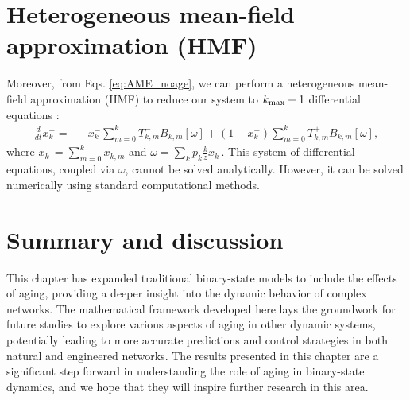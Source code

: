 

\section{\label{sec:Heterogeneous mean-field approximation}  Heterogeneous mean-field approximation (HMF)}

Moreover, from Eqs. \eqref{eq:AME_noage}, we can perform a heterogeneous mean-field approximation (HMF) to reduce our system to $k_{\rm max}+1$ differential equations \cite{gleeson-2013}:
\begin{eqnarray}
    \frac{d}{d t} x^{-}_{k}= &- x^{-}_{k} \sum_{m=0}^{k} T^{-}_{k, m} B_{k, m}[\omega] +\left(1-x^{-}_{k}\right) \sum_{m=0}^{k} T^{+}_{k, m} B_{k, m}[\omega],
    \label{eq:HMF}
\end{eqnarray}
where $x^{-}_{k} = \sum_{m=0}^{k} x^{-}_{k,m}$ and $\omega= \sum_k p_k \frac{k}{z} x^{-}_{k}$. This system of differential equations, coupled via $\omega$, cannot be solved analytically. However, it can be solved numerically using standard computational methods.


\section{\label{sec:Summary} Summary and discussion}

This chapter has expanded traditional binary-state models to include the effects of aging, providing a deeper insight into the dynamic behavior of complex networks. The mathematical framework developed here lays the groundwork for future studies to explore various aspects of aging in other dynamic systems, potentially leading to more accurate predictions and control strategies in both natural and engineered networks. The results presented in this chapter are a significant step forward in understanding the role of aging in binary-state dynamics, and we hope that they will inspire further research in this area.